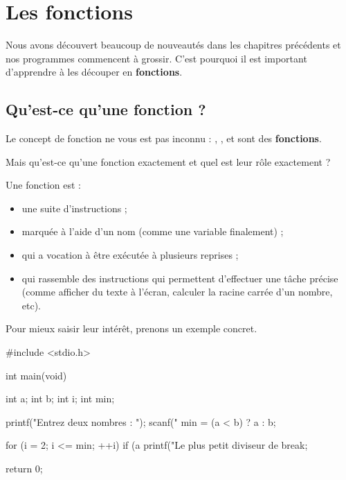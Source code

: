 \chapter{Les fonctions}
\label{les-fonctions}

Nous avons découvert beaucoup de nouveautés dans les chapitres précédents et nos
programmes commencent à grossir. C'est pourquoi il est important
d'apprendre à les découper en \textbf{fonctions}.

\section{Qu'est-ce qu'une fonction ?}
\label{Qu-est-ce-qu-une-fonction-?}

Le concept de fonction ne vous est pas inconnu : ,
, et  sont des \textbf{fonctions}.

\begin{questionbox}
  Mais qu'est-ce qu'une fonction
exactement et quel est leur rôle exactement ?
\end{questionbox}


Une fonction est :

\begin{itemize}
\item
  une suite d'instructions ;
\item
  marquée à l'aide d'un nom (comme une variable finalement) ;
\item
  qui a vocation à être exécutée à plusieurs reprises ;
\item
  qui rassemble des instructions qui permettent d'effectuer une tâche
  précise (comme afficher du texte à l'écran, calculer la racine carrée
  d'un nombre, etc).
\end{itemize}

Pour mieux saisir leur intérêt, prenons un exemple concret.

\begin{C}
#include <stdio.h>


int main(void)
{
    int a;
    int b;
    int i;
    int min;

    printf("Entrez deux nombres : ");
    scanf("%
    min = (a < b) ? a : b;

    for (i = 2; i <= min; ++i)
    {
        if (a %
        {
            printf("Le plus petit diviseur de %
            break;
        }
    }

    return 0;
}
\end{C}

